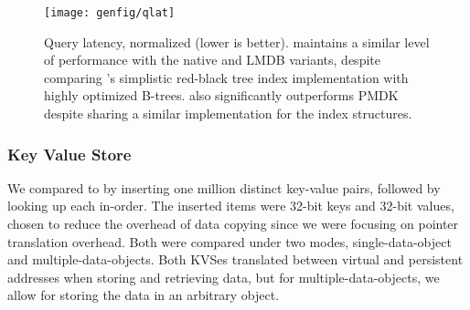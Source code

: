 \begin{figure}
    \centering
    \texttt{[image: genfig/qlat]}
    \caption[Query latency]{Query latency, normalized (lower is better). \Twizzler maintains a similar level of
        performance with the native and LMDB variants, despite comparing \Twizzler's simplistic
        red-black tree index
        implementation with highly optimized B-trees. \Twizzler also significantly outperforms PMDK
        despite sharing a similar implementation for the index structures.}
    \label{fig:qlat}
\end{figure}


\subsubsection{Key Value Store}
\label{sec:kvperf}

We compared \nvkv to \unixkv
by inserting one
million distinct key-value pairs, followed by looking up each in-order. The inserted items were 32-bit
keys and 32-bit values, chosen to reduce the overhead of data copying since we were focusing on
pointer translation overhead.
Both were
compared under two modes, single-data-object and multiple-data-objects. Both KVSes translated
between virtual and persistent addresses when storing and retrieving data, but for
multiple-data-objects, we allow for storing the data in an arbitrary object.

